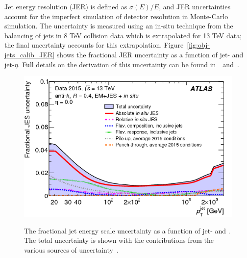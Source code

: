 Jet energy resolution (JER) is defined as $\sigma(E)/E$, and JER uncertainties
account for the imperfect simulation of detector resolution in Monte-Carlo simulation.
The uncertainty is measured using an in-situ technique from the balancing of jets in 8 TeV collision data
which is extrapolated for 13 TeV data; the final uncertainty accounts for this extrapolation.
Figure~\ref{fig:obj-jets_calib_JER} shows the fractional JER uncertainty as a function of jet-\pT{} and jet-$\eta$.
Full details on the derivation of this uncertainty can be found in~\cite{obj-jets_calib_2015}~and~\cite{obj-jets_calib_JER_8TeV}.

\begin{figure}[!htb]
  \begin{center}
    \captionsetup[subfigure]{aboveskip=0pt,justification=centering}
     {\includegraphics[width=0.4\linewidth, angle=0]{figs/Objects/jets_uncert_JES_pt.png} }
  \end{center}
 \vspace{-1em}
  \caption[The fractional jet energy scale uncertainty as a function of jet-\pT{} and \eta.]
          { \label{fig:obj-jets_calib_JES} The fractional jet energy scale uncertainty as a function of jet-\pT{} and \eta.
            The total uncertainty is shown with the contributions from the various sources of uncertainty~\cite{obj-jets_calib_run2}.}
 \vspace{0.2em}
  \begin{center}      
    \captionsetup[subfigure]{aboveskip=0pt,justification=centering}

\end{center}
\end{figure}
